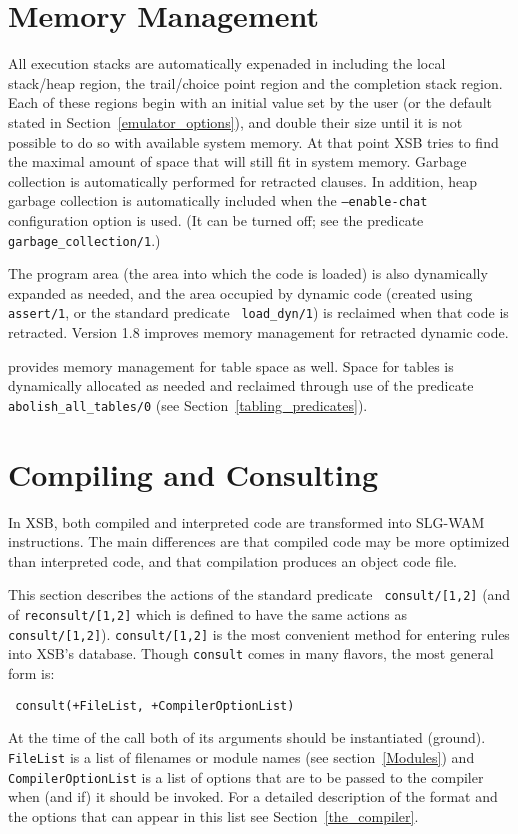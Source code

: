 \section{Memory Management}\label{memory_management}
All execution stacks are automatically expenaded in \version{}
including the local stack/heap region, the trail/choice point region
and the completion stack region.  Each of these regions begin with an
initial value set by the user (or the default stated in
Section~\ref{emulator_options}), and double their size until it is not
possible to do so with available system memory.  At that point XSB
tries to find the maximal amount of space that will still fit in
system memory.  Garbage collection is automatically performed for
retracted clauses.  In addition, heap garbage collection is
automatically included when the {\tt --enable-chat} configuration
option is used.  (It can be turned off; see the predicate {\tt
garbage\_collection/1}.) 

The program area (the area into which the code is loaded) is also
dynamically expanded as needed, and the area occupied by dynamic code
(created using {\tt assert/1}, or the standard predicate {\tt
load\_dyn/1}) is reclaimed when that code is retracted.  Version 1.8
improves memory management for retracted dynamic code.

\version{} provides memory management for table space as well.  Space for
tables is dynamically allocated as needed and reclaimed through use of
the predicate {\tt abolish\_all\_tables/0}
(see Section~\ref{tabling_predicates}).


\section{Compiling and Consulting} \label{Consulting}
In XSB, both compiled and interpreted code are transformed into
SLG-WAM instructions.  The main differences are that compiled code may
be more optimized than interpreted code, and that compilation produces
an object code file.

This section describes the actions of the standard predicate {\tt
consult/[1,2]} (and of {\tt reconsult/[1,2]} which is defined to have
the same actions as {\tt consult/[1,2]}).  {\tt consult/[1,2]} is the
most convenient method for entering rules into XSB's database.  Though
{\tt consult} comes in many flavors, the most general form is:
\begin{center}{\tt
	consult(+FileList, +CompilerOptionList) }
\end{center} 
At the time of the call both of its arguments should be instantiated
(ground).  {\tt FileList} is a list of filenames or module names (see
section~\ref{Modules}) and {\tt CompilerOptionList} is a list of
options that are to be passed to the compiler when (and if) it should
be invoked.  For a detailed description of the format and the options
that can appear in this list see Section~\ref{the_compiler}.

